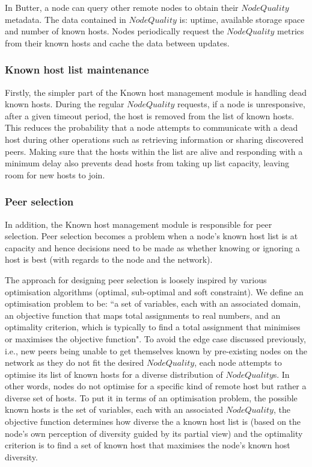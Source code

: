 In Butter, a node can query other remote nodes to obtain their $NodeQuality$ metadata. The data contained in $NodeQuality$ is: uptime, available storage space and number of known hosts. Nodes periodically request the $NodeQuality$ metrics from their known hosts and cache the data between updates.


\subsubsection{Known host list maintenance}

Firstly, the simpler part of the Known host management module is handling dead known hosts. During the regular $NodeQuality$ requests, if a node is unresponsive, after a given timeout period, the host is removed from the list of known hosts. This reduces the probability that a node attempts to communicate with a dead host during other operations such as retrieving information or sharing discovered peers. Making sure that the hosts within the list are alive and responding with a minimum delay also prevents dead hosts from taking up list capacity, leaving room for new hosts to join.

\subsubsection{Peer selection}

In addition, the Known host management module is responsible for peer selection. Peer selection becomes a problem when a node's known host list is at capacity and hence decisions need to be made as whether knowing or ignoring a host is best (with regards to the node and the network).

The approach for designing peer selection is loosely inspired by various optimisation algorithms (optimal, sub-optimal and soft constraint). We define an optimisation problem to be: ``a set of variables, each with an associated domain, an objective function that maps total assignments to real numbers, and an optimality criterion, which is typically to find a total assignment that minimises or maximises the objective function"\cite{poole2017ai}. To avoid the edge case discussed previously, i.e., new peers being unable to get themselves known by pre-existing nodes on the network as they do not fit the desired $NodeQuality$, each node attempts to optimise its list of known hosts for a diverse distribution of $NodeQuality$s. In other words, nodes do not optimise for a specific kind of remote host but rather a diverse set of hosts. To put it in terms of an optimisation problem, the possible known hosts is the set of variables, each with an associated $NodeQuality$, the objective function determines how diverse the a known host list is (based on the node's own perception of diversity guided by its partial view) and the optimality criterion is to find a set of known host that maximises the node's known host diversity.\\

